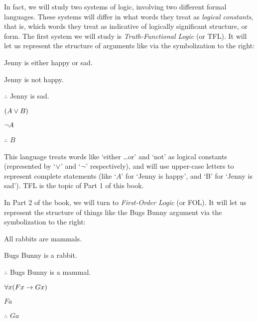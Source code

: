 In fact, we will study two systems of logic, involving two different formal languages. These systems will differ in what words they treat as \emph{logical constants}, that is,  which words they treat as indicative of logically significant structure, or form.  The first system we will study is \emph{Truth-Functional Logic} (or TFL).  It will let us represent the structure of arguments like  via the symbolization to the right:

\begin{multicols}{2}

	\begin{earg}
		\item[\eref{exarg8}] Jenny is either happy or sad.
		\item[] Jenny is not happy.
		\item[] $\therefore$ Jenny is sad.
	\end{earg}

\columnbreak

	\begin{earg}
		\item[] $(A \vee B)$
		\item[] $\neg A$
		\item[] $\therefore$ $B$
	\end{earg}

\end{multicols}

\noindent This language treats words like `either \ldots or' and `not' as logical constants (represented by `$\vee$' and `$\neg$' respectively), and will use upper-case letters to represent complete statements (like `$A$' for `Jenny is happy', and `B' for `Jenny is sad').  TFL is the topic of Part 1 of this book.

In Part 2 of the book, we will turn to \emph{First-Order Logic} (or FOL).  It will let us represent the structure of things like the Bugs Bunny argument via the symbolization to the right:


\begin{multicols}{2}

\begin{earg}
\item[\eref{exarg1}]All rabbits are mammals.
\item[] Bugs Bunny is a rabbit.
\item[] $\therefore$ Bugs Bunny is a mammal.
\end{earg}

\columnbreak

	\begin{earg}
		\item[] $\forall x(Fx \rightarrow Gx)$
		\item[] $Fa$
		\item[] $\therefore$ $Ga$
	\end{earg}

\end{multicols}


